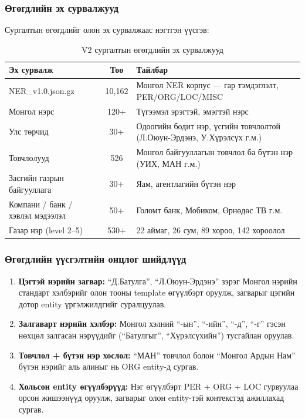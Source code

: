 \subsubsection{Өгөгдлийн эх сурвалжууд}

Сургалтын өгөгдлийг олон эх сурвалжаас нэгтгэн үүсгэв:

\begin{table}[h!]
\centering
\renewcommand{\arraystretch}{1.4}
\begin{tabular}{|l|c|p{5.5cm}|}
\hline
\textbf{Эх сурвалж} & \textbf{Тоо} & \textbf{Тайлбар} \\ \hline
NER\_v1.0.json.gz & 10,162 & Монгол NER корпус — гар тэмдэглэлт, PER/ORG/LOC/MISC \\ \hline
Монгол нэрс & 120+ & Түгээмэл эрэгтэй, эмэгтэй нэрс \\ \hline
Улс төрчид & 30+ & Одоогийн бодит нэр, үсгийн товчлолтой (Л.Оюун-Эрдэнэ, У.Хүрэлсүх г.м.) \\ \hline
Товчлолууд & 526 & Монгол байгууллагын товчлол ба бүтэн нэр (УИХ, МАН г.м.) \\ \hline
Засгийн газрын байгууллага & 30+ & Яам, агентлагийн бүтэн нэр \\ \hline
Компани / банк / хэвлэл мэдээлэл & 50+ & Голомт банк, Мобиком, Өрнөдөс ТВ г.м. \\ \hline
Газар нэр (level 2--5) & 530+ & 22 аймаг, 26 сум, 89 хороо, 142 хороолол \\ \hline
\end{tabular}
\caption{V2 сургалтын өгөгдлийн эх сурвалжууд}
\label{tab:v2_data_sources}
\end{table}

\subsubsection{Өгөгдлийн үүсгэлтийн онцлог шийдлүүд}

\begin{enumerate}
    \item \textbf{Цэгтэй нэрийн загвар:} ``Д.Батулга'', ``Л.Оюун-Эрдэнэ'' зэрэг Монгол нэрийн стандарт хэлбэрийг олон тооны template өгүүлбэрт оруулж, загварыг цэгийн дотор entity үргэлжилдгийг суралцуулав.
    \item \textbf{Залгаварт нэрийн хэлбэр:} Монгол хэлний ``-ын'', ``-ийн'', ``-д'', ``-г'' гэсэн нөхцөл залгасан нэрүүдийг (``Батулгыг'', ``Хүрэлсүхийн'') тусгайлан оруулав.
    \item \textbf{Товчлол + бүтэн нэр хослол:} ``МАН'' товчлол болон ``Монгол Ардын Нам'' бүтэн нэрийг аль алиныг нь ORG entity-д сургав.
    \item \textbf{Хольсон entity өгүүлбэрүүд:} Нэг өгүүлбэрт PER + ORG + LOC гурвуулаа орсон жишээнүүд оруулж, загварыг олон entity-тэй контекстэд ажиллахад сургав.
\end{enumerate}

